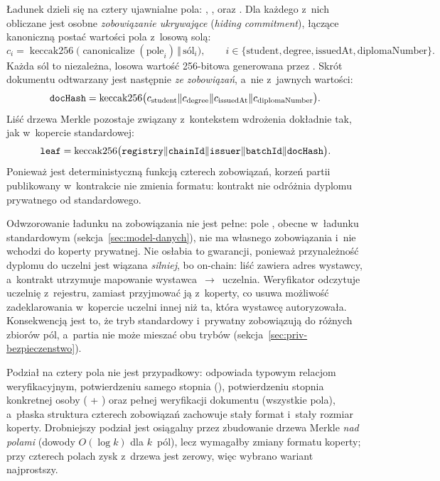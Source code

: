 Ładunek dzieli się na cztery ujawnialne pola: , ,
 oraz . Dla każdego z~nich obliczane jest osobne
\emph{zobowiązanie ukrywające} (\emph{hiding commitment}), łączące kanoniczną postać
wartości pola z~losową solą:
\[
  c_i = \operatorname{keccak256}\bigl(\operatorname{canonicalize}(\text{pole}_i)
        \,\Vert\, \text{sól}_i\bigr),
  \qquad i \in \{\text{student}, \text{degree}, \text{issuedAt},
        \text{diplomaNumber}\}.
\]
Każda sól to niezależna, losowa wartość 256-bitowa generowana przez
. Skrót dokumentu odtwarzany jest następnie \emph{ze
zobowiązań}, a~nie z~jawnych wartości:
\[
  \texttt{docHash} = \operatorname{keccak256}
    \bigl(c_{\text{student}} \Vert c_{\text{degree}}
    \Vert c_{\text{issuedAt}} \Vert c_{\text{diplomaNumber}}\bigr).
\]
Liść drzewa Merkle pozostaje związany z~kontekstem wdrożenia dokładnie tak, jak
w~kopercie standardowej:
\[
  \texttt{leaf} = \operatorname{keccak256}
    \bigl(\texttt{registry} \Vert \texttt{chainId} \Vert \texttt{issuer}
    \Vert \texttt{batchId} \Vert \texttt{docHash}\bigr).
\]
Ponieważ  jest deterministyczną funkcją czterech zobowiązań, korzeń
partii publikowany w~kontrakcie nie zmienia formatu: kontrakt nie odróżnia
dyplomu prywatnego od standardowego.

Odwzorowanie ładunku na zobowiązania nie jest pełne: pole ,
obecne w~ładunku standardowym (sekcja~\ref{sec:model-danych}), nie ma własnego
zobowiązania i~nie wchodzi do  koperty prywatnej. Nie osłabia to
gwarancji, ponieważ przynależność dyplomu do uczelni jest wiązana \emph{silniej},
bo on-chain: liść zawiera adres wystawcy, a~kontrakt utrzymuje mapowanie
wystawca~$\rightarrow$~uczelnia. Weryfikator odczytuje uczelnię z~rejestru,
zamiast przyjmować ją z~koperty, co usuwa możliwość zadeklarowania w~kopercie
uczelni innej niż ta, która wystawcę autoryzowała. Konsekwencją jest to, że tryb
standardowy i~prywatny zobowiązują do różnych zbiorów pól, a~partia nie może
mieszać obu trybów (sekcja~\ref{sec:priv-bezpieczenstwo}).

Podział na cztery pola nie jest przypadkowy: odpowiada typowym relacjom
weryfikacyjnym, potwierdzeniu samego stopnia (), potwierdzeniu
stopnia konkretnej osoby ( + ) oraz pełnej
weryfikacji dokumentu (wszystkie pola), a~płaska struktura czterech zobowiązań
zachowuje stały format  i~stały rozmiar koperty. Drobniejszy podział
jest osiągalny przez zbudowanie drzewa Merkle \emph{nad polami}
(dowody $O(\log k)$ dla $k$~pól), lecz wymagałby zmiany formatu koperty;
przy czterech polach zysk z~drzewa jest zerowy, więc wybrano wariant
najprostszy.

